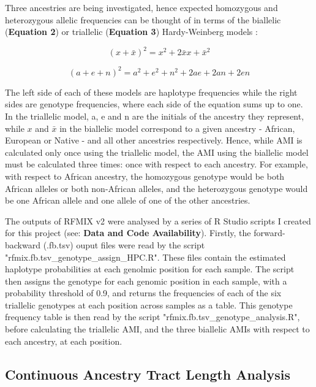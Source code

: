 \documentclass[11pt]{article}
\begin{document}
Three ancestries are being investigated, hence expected homozygous and heterozygous allelic frequencies can be thought of in terms of the biallelic (\textbf{Equation 2}) or triallelic (\textbf{Equation 3}) Hardy-Weinberg models \parencite{Norris2019}: 

\begin{equation}
    (x + \bar{x})^{2} = x^{2} + 2\bar{x}x + \bar{x}^{2}
\end{equation}


\begin{equation}
    (a + e + n)^{2} = a^{2} + e^{2} + n^{2} + 2ae + 2an + 2en
\end{equation}
\vspace{3mm}


The left side of each of these models are haplotype frequencies while the right sides are genotype frequencies, where each side of the equation sums up to one. In the triallelic model, a, e and n are the initials of the ancestry they represent, while $x$ and $\bar{x}$ in the biallelic model correspond to a given ancestry - African, European or Native - and all other ancestries respectively. Hence, while AMI is calculated only once using the triallelic model, the AMI using the biallelic model must be calculated three times: once with respect to each ancestry. For example, with respect to African ancestry, the homozygous genotype would be both African alleles or both non-African alleles, and the heterozygous genotype would be one African allele and one allele of one of the other ancestries.

The outputs of RFMIX v2 were analysed by a series of R Studio scripts I created for this project (see: \textbf{Data and Code Availability}). Firstly, the forward-backward (.fb.tsv) ouput files were read by the script "rfmix.fb.tsv\_genotype\_assign\_HPC.R". These files contain the estimated haplotype probabilities at each genolmic position for each sample. The script then assigns the genotype for each genomic position in each sample, with a probability threshold of 0.9, and returns the frequencies of each of the six triallelic genotypes at each position across samples as a table. This genotype frequency table is then read by the script "rfmix.fb.tsv\_genotype\_analysis.R", before calculating the triallelic AMI, and the three biallelic AMIs with respect to each ancestry, at each position.






\subsection{Continuous Ancestry Tract Length Analysis}
\end{document}
